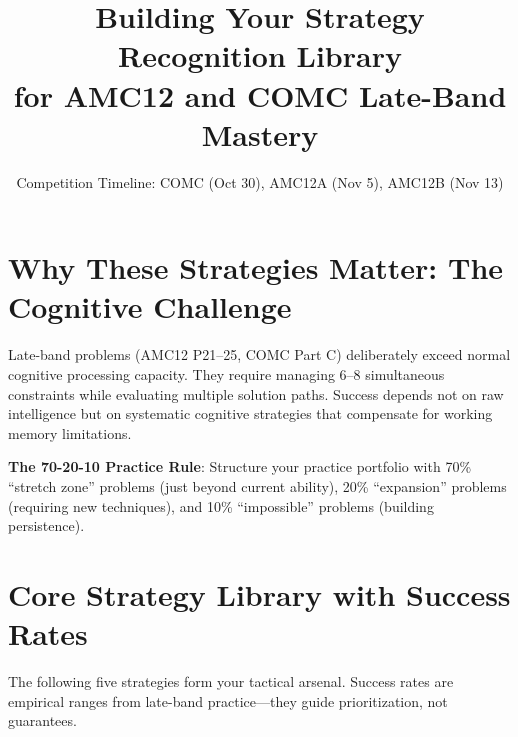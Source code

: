 \documentclass[]{article}
\title{\textbf{Building Your Strategy Recognition Library\\for AMC12 and COMC Late-Band Mastery}}
\author{}
\date{Competition Timeline: COMC (Oct 30), AMC12A (Nov 5), AMC12B (Nov 13)}
\begin{document}
\maketitle

\section{Why These Strategies Matter: The Cognitive Challenge}

Late-band problems (AMC12 P21--25, COMC Part C) deliberately exceed normal cognitive processing capacity. They require managing 6--8 simultaneous constraints while evaluating multiple solution paths. Success depends not on raw intelligence but on systematic cognitive strategies that compensate for working memory limitations.

\begin{strategybox}
\textbf{The 70-20-10 Practice Rule}: Structure your practice portfolio with 70\% ``stretch zone'' problems (just beyond current ability), 20\% ``expansion'' problems (requiring new techniques), and 10\% ``impossible'' problems (building persistence).
\end{strategybox}

\section{Core Strategy Library with Success Rates}

The following five strategies form your tactical arsenal. Success rates are empirical ranges from late-band practice---they guide prioritization, not guarantees.
\end{document}
